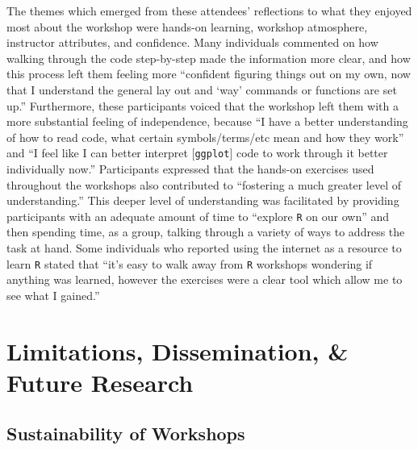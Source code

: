 \documentclass[12pt]{article}
\begin{document}
\quad The themes which emerged from these attendees' reflections to what they 
enjoyed most about the workshop were hands-on learning, workshop atmosphere,
instructor attributes, and confidence. Many individuals commented on how walking
through the code step-by-step made the information more clear, and how this
process left them feeling more ``confident figuring things out on my own, now 
that I understand the general lay out and `way' commands or functions are set
up.'' Furthermore, these participants voiced that the workshop left them with a
more substantial feeling of independence, because ``I have a better
understanding of how to read code, what certain symbols/terms/etc mean and how
they work'' and ``I feel like I can better interpret [\texttt{ggplot}] code to
work through it better individually now.'' Participants expressed that the
hands-on exercises used throughout the workshops also contributed to 
``fostering a much greater level of understanding.'' This deeper level of
understanding was facilitated by providing participants with an adequate
amount of time to ``explore \texttt{R} on our own'' and then spending time, as a
group, talking through a variety of ways to address the task at hand. Some
individuals who reported using the internet as a resource to learn \texttt{R}
stated that ``it's easy to walk away from \texttt{R} workshops wondering if
anything was learned, however the exercises were a clear tool which allow me to
see what I gained.''  



\section{Limitations, Dissemination, \& Future Research} 
\label{sec:future}

\subsection{Sustainability of Workshops}  
\end{document}
